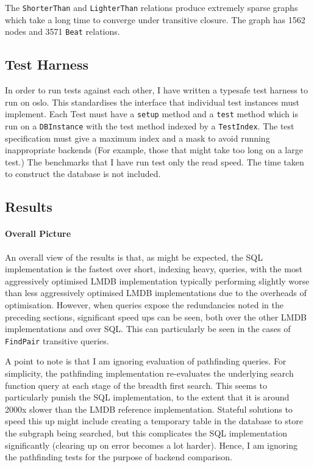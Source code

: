 \documentclass[12pt,a4paper,twoside,openright]{report}
\newcommand\codeName[1]{\texttt{#1}}
\begin{document}
		The \codeName{ShorterThan} and \codeName{LighterThan} relations produce extremely sparse graphs which take a long time to converge under transitive closure. The graph has 1562 nodes and 3571 \codeName{Beat} relations.
	\subsection{Test Harness}
	In order to run tests against each other, I have written a typesafe test harness to run on oslo. This standardises the interface that individual test instances must implement. Each Test must have a \codeName{setup} method and a \codeName{test} method which is run on a \codeName{DBInstance} with the test method indexed by a \codeName{TestIndex}. The test specification must give a maximum index and a mask to avoid running inappropriate backends (For example, those that might take too long on a large test.) The benchmarks that I have run test only the read speed. The time taken to construct the database is not included.
	
	\subsection{Results}
		\paragraph{Overall Picture}
		An overall view of the results is that, as might be expected, the SQL implementation is the fastest over short, indexing heavy, queries, with the most aggressively optimised LMDB implementation typically performing slightly worse than less aggressively optimised LMDB implementations due to the overheads of optimisation. However, when queries expose the redundancies noted in the preceding sections, significant speed ups can be seen, both over the other LMDB implementations and over SQL. This can particularly be seen in the cases of \codeName{FindPair} transitive queries.

		A point to note is that I am ignoring evaluation of pathfinding queries. For simplicity, the pathfinding implementation re-evaluates the underlying search function query at each stage of the breadth first search. This seems to particularly punish the SQL implementation, to the extent that it is around 2000x slower than the LMDB reference implementation. Stateful solutions to speed this up might include creating a temporary table in the database to store the subgraph being searched, but this complicates the SQL implementation significantly (clearing up on error becomes a lot harder). Hence, I am ignoring the pathfinding tests for the purpose of backend comparison.
\end{document}
